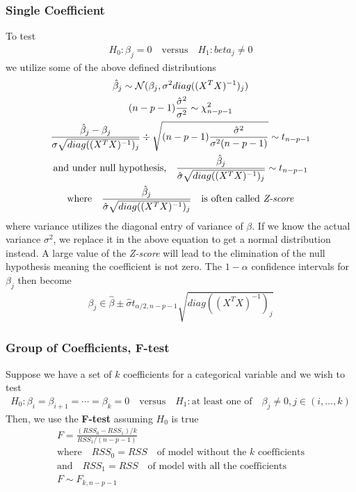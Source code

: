 \documentclass[../statistical_learning_notes.tex]{subfiles}
\begin{document}
\subsubsection{Single Coefficient}
To test
\begin{align*}
    H_{0}: \beta_{j} = 0 \quad \text{versus} \quad H_{1}: beta_{j} \neq 0
\end{align*}
we utilize some of the above defined distributions
\begin{gather*}
    \hat{\beta}_{j} \sim \mathcal{N}(\beta_{j}, \sigma^{2}diag((X^{T}X)^{-1})_{j})\\
    (n - p - 1) \frac{\hat{\sigma}^{2}}{\sigma^{2}} \sim \chi_{n-p-1}^{2}\\
    \frac{\hat{\beta}_{j} - \beta_{j}}{\sigma\sqrt{diag((X^{T}X)^{-1})_{j}}} \div \sqrt{(n - p - 1) \frac{\hat{\sigma}^{2}}{\sigma^{2}(n-p-1)}} \sim t_{n-p-1}\\
    \text{and under null hypothesis,} \quad \frac{\hat{\beta}_{j}}{\hat{\sigma}\sqrt{diag((X^{T}X)^{-1})_{j}}} \sim t_{n-p-1}\\
    \text{where} \quad \frac{\hat{\beta}_{j}}{\hat{\sigma}\sqrt{diag((X^{T}X)^{-1})_{j}}} \quad \text{is often called \emph{Z-score}}
\end{gather*}
where variance utilizes the diagonal entry of variance of $\beta$. If we know the actual variance $\sigma^{2}$, we replace it in the above equation to get a normal distribution instead. A large value of the \emph{Z-score} will lead to the elimination of the null hypothesis meaning the coefficient is not zero. The $1-\alpha$ confidence intervals for $\beta_{j}$ then become
\begin{gather*}
    \beta_{j} \in \hat{\beta} \pm \hat{\sigma} t_{\alpha/2, n-p-1} \sqrt{diag((X^{T}X)^{-1})_{j}}
\end{gather*}


\subsubsection{Group of Coefficients, F-test}
Suppose we have a set of $k$ coefficients for a categorical variable and we wish to test
\begin{align*}
     H_{0}: \beta_{i} = \beta_{i+1} = \cdots = \beta_{k} = 0 \quad \text{versus} \quad H_{1}: \text{at least one of} \quad \beta_{j} \neq 0, j \in (i, \ldots, k)
\end{align*}
Then, we use the \textbf{F-test} assuming $H_{0}$ is true
\begin{gather*}
    F = \frac{(RSS_{0} - RSS_{1})/k}{RSS_{1}/(n-p-1)}\\
    \text{where} \quad RSS_{0} = RSS \quad \text{of model without the $k$ coefficients}\\
    \text{and} \quad RSS_{1} = RSS \quad \text{of model with all the coefficients}\\
    F \sim F_{k, n - p - 1}
\end{gather*}
\end{document}
